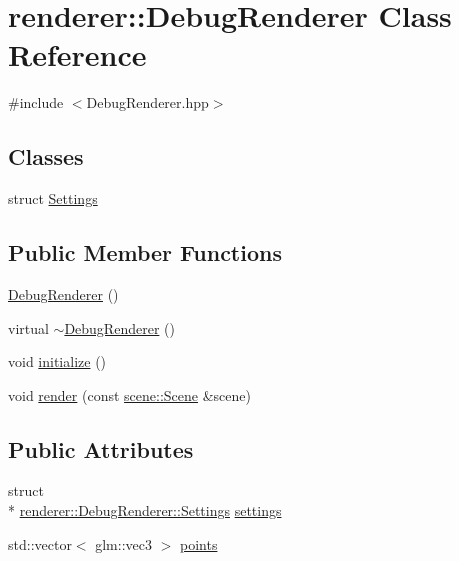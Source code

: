 \hypertarget{classrenderer_1_1DebugRenderer}{\section{renderer\-:\-:Debug\-Renderer Class Reference}
\label{classrenderer_1_1DebugRenderer}
}


{\ttfamily \#include $<$Debug\-Renderer.\-hpp$>$}

\subsection*{Classes}
\begin{DoxyCompactItemize}
\item 
struct \hyperlink{structrenderer_1_1DebugRenderer_1_1Settings}{Settings}
\end{DoxyCompactItemize}
\subsection*{Public Member Functions}
\begin{DoxyCompactItemize}
\item 
\hyperlink{classrenderer_1_1DebugRenderer_a85ee1ad31d240932888a0b1733a878ee}{Debug\-Renderer} ()
\item 
virtual \hyperlink{classrenderer_1_1DebugRenderer_a17ce9437e93efe4711a9bdd7ba4d5873}{$\sim$\-Debug\-Renderer} ()
\item 
void \hyperlink{classrenderer_1_1DebugRenderer_a971dd631308df321775f801ec2648750}{initialize} ()
\item 
void \hyperlink{classrenderer_1_1DebugRenderer_a29c10f06518801656aa53773893b0d08}{render} (const \hyperlink{classscene_1_1Scene}{scene\-::\-Scene} \&scene)
\end{DoxyCompactItemize}
\subsection*{Public Attributes}
\begin{DoxyCompactItemize}
\item 
struct \\*
\hyperlink{structrenderer_1_1DebugRenderer_1_1Settings}{renderer\-::\-Debug\-Renderer\-::\-Settings} \hyperlink{classrenderer_1_1DebugRenderer_aa9f50c04944331671da50e5169b9f3b1}{settings}
\item 
std\-::vector$<$ glm\-::vec3 $>$ \hyperlink{classrenderer_1_1DebugRenderer_a158e290299f7fecfbb2ab24d5a64837b}{points}
\end{DoxyCompactItemize}


